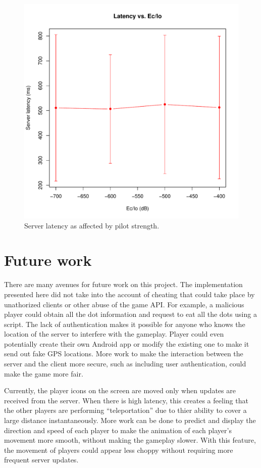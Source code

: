 \documentclass{acm_proc_article-sp}
\begin{document}
\begin{figure}
\centering
\includegraphics[scale=0.5]{figs/latencyVsEcIo}
\caption{Server latency as affected by pilot strength.}
\label{fig:latencyVsEcIo}
\end{figure}

\section{Future work}
\label{future}

There are many avenues for future work on this project.  The implementation
presented here did not take into the account of cheating that could take place
by unathorized clients or other abuse of the game API.  For example, a
malicious player could obtain all the dot information and request to eat all
the dots using a script. The lack of authentication makes it possible for
anyone who knows the location of the server to interfere with the gameplay.
Player could even potentially create their own Android app or modify the
existing one to make it send out fake GPS locations.  More work to make the
interaction between the server and the client more secure, such as including
user authentication, could make the game more fair.

Currently, the player icons on the screen are moved only when updates are
received from the server.  When there is high latency, this creates a feeling
that the other players are performing ``teleportation'' due to thier ability to
cover a large distance instantaneously.  More work can be done to predict and
display the direction and speed of each player to make the animation of each
player's movement more smooth, without making the gameplay slower. With this
feature, the movement of players could appear less choppy without requiring
more frequent server updates.
\end{document}
